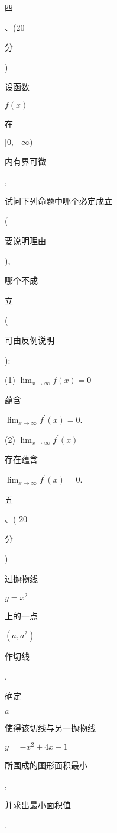 \documentclass[10pt]{article}
\begin{document}
\begin{CJK}{UTF8}{mj}四\end{CJK}、(20 \begin{CJK}{UTF8}{mj}分\end{CJK}) \begin{CJK}{UTF8}{mj}设函数\end{CJK} $f(x)$ \begin{CJK}{UTF8}{mj}在\end{CJK} $[0,+\infty)$ \begin{CJK}{UTF8}{mj}内有界可微\end{CJK}, \begin{CJK}{UTF8}{mj}试问下列命题中哪个必定成立\end{CJK}(\begin{CJK}{UTF8}{mj}要说明理由\end{CJK}), \begin{CJK}{UTF8}{mj}哪个不成\end{CJK} \begin{CJK}{UTF8}{mj}立\end{CJK}(\begin{CJK}{UTF8}{mj}可由反例说明\end{CJK}):

(1) $\lim _{x \rightarrow \infty} f(x)=0$ \begin{CJK}{UTF8}{mj}蕴含\end{CJK} $\lim _{x \rightarrow \infty} f^{\prime}(x)=0$.

(2) $\lim _{x \rightarrow \infty} f^{\prime}(x)$ \begin{CJK}{UTF8}{mj}存在蕴含\end{CJK} $\lim _{x \rightarrow \infty} f^{\prime}(x)=0$.

\begin{CJK}{UTF8}{mj}五\end{CJK}、( 20 \begin{CJK}{UTF8}{mj}分\end{CJK}) \begin{CJK}{UTF8}{mj}过抛物线\end{CJK} $y=x^{2}$ \begin{CJK}{UTF8}{mj}上的一点\end{CJK} $\left(a, a^{2}\right)$ \begin{CJK}{UTF8}{mj}作切线\end{CJK}, \begin{CJK}{UTF8}{mj}确定\end{CJK} $a$ \begin{CJK}{UTF8}{mj}使得该切线与另一抛物线\end{CJK} $y=-x^{2}+4 x-1$ \begin{CJK}{UTF8}{mj}所围成的图形面积最小\end{CJK}, \begin{CJK}{UTF8}{mj}并求出最小面积值\end{CJK}.
\end{document}
